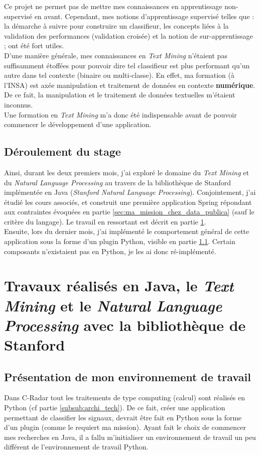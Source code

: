         Ce projet ne permet pas de mettre mes connaissances en apprentissage non-supervisé en avant. Cependant, mes notions d'apprentissage supervisé telles que : la démarche à suivre pour construire un classifieur, les concepts liées à la validation des performances (validation croisée) et la notion de sur-apprentissage ; ont été fort utiles.\\

        D'une manière générale, mes connaissances en \textit{Text Mining} n'étaient pas suffisamment étoffées pour pouvoir dire tel classifieur est plus performant qu'un autre dans tel contexte (binaire ou multi-classe). En effet, ma formation (à l'INSA) est axée manipulation et traitement de données en contexte \textbf{numérique}. De ce fait, la manipulation et le traitement de données textuelles m'étaient inconnus.\\

        Une formation en \textit{Text Mining} m'a donc été indispensable avant de pouvoir commencer le développement d'une application.

    \subsection{Déroulement du stage}
        Ainsi, durant les deux premiers mois, j'ai exploré le domaine du \textit{Text Mining} et du \textit{Natural Language Processing} au travers de la bibliothèque de Stanford implémentée en Java (\textit{Stanford Natural Language Processing}). Conjointement, j'ai étudié les cours associés, et construit une première application Spring répondant aux contraintes évoquées en partie \ref{sec:ma_mission_chez_data_publica} (sauf le critère du langage). Le travail en ressortant est décrit en partie \ref{sec:travaux_realises_en_java}.\\

        Ensuite, lors du dernier mois, j’ai implémenté le comportement général de cette application sous la forme d’un plugin Python, visible en partie \ref{}. Certain composants n'existaient pas en Python, je les ai donc ré-implémenté.

\section{Travaux réalisés en Java, le \textit{Text Mining} et le \textit{Natural Language Processing} avec la bibliothèque de Stanford}
\label{sec:travaux_realises_en_java}
    \subsection{Présentation de mon environnement de travail}
        Dans C-Radar tout les traitements de type \og computing \fg (calcul) sont réalisés en Python (cf partie \ref{subsub:archi_tech}). De ce fait, créer une application permettant de classifier les signaux, devrait être fait en Python sous la forme d'un plugin (comme le requiert ma mission). Ayant fait le choix de commencer mes recherches en Java, il a fallu m'initialiser un environnement de travail un peu différent de l'environnement de travail Python.

